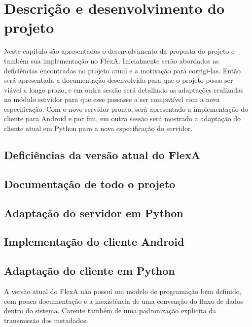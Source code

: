 % 
% 


\chapter{Descrição e desenvolvimento do projeto}


    Neste capítulo são apresentados o desenvolvimento da proposta do projeto e também sua implementação no FlexA. Inicialmente serão abordados as deficiências encontradas no projeto atual e a motivação para corrigi-las. Então será apresentada a documentação desenvolvida para que o projeto possa ser viável a longo prazo, e em outra sessão será detalhado as adaptações realizadas no módulo servidor para que esse passasse a ser compatível com a nova especificação. Com o novo servidor pronto, será apresentado a implementação do cliente para Android e por fim, em outra sessão será mostrado a adaptação do cliente atual em Python para a nova especificação do servidor.

    \section{Deficiências da versão atual do FlexA}
    \section{Documentação de todo o projeto}
    \section{Adaptação do servidor em Python}
    \section{Implementação do cliente Android}
    \section{Adaptação do cliente em Python}
    
    
    
    

        A versão atual do FlexA não possuí um modelo de programação bem definido, com pouca documentação e a inexistência de uma convenção do fluxo de dados dentro do sistema. Carente também de uma padronização explicita da transmissão dos metadados.
        
